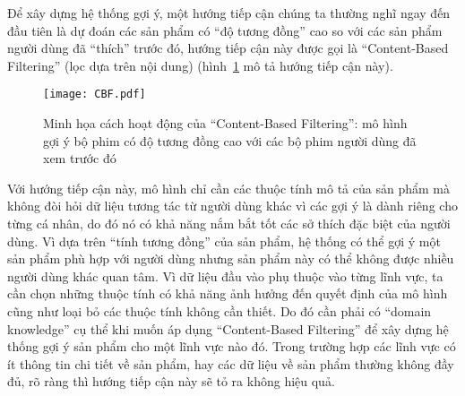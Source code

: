 Để xây dựng hệ thống gợi ý, một hướng tiếp cận chúng ta thường nghĩ ngay đến đầu tiên
là dự đoán các sản phẩm có ``độ tương đồng'' cao so với các sản phẩm người dùng đã ``thích'' trước đó,
hướng tiếp cận này được gọi là ``Content-Based Filtering'' (lọc dựa trên nội dung) (hình~\ref{fig_CBF} mô tả hướng tiếp cận này).
\begin{figure}
    \centering
	\texttt{[image: CBF.pdf]}
    \caption[Minh họa cách hoạt động của ``Content-Based Filtering'']{Minh họa cách hoạt động của ``Content-Based Filtering'':
    mô hình gợi ý bộ phim có độ tương đồng cao với các bộ phim
    người dùng đã xem trước đó}
    \label{fig_CBF}
\end{figure}
Với hướng tiếp cận này, mô hình chỉ cần các thuộc tính mô tả của sản phẩm mà 
không đòi hỏi dữ liệu tương tác từ người dùng khác
vì các gợi ý là dành riêng cho từng cá nhân, do đó nó có khả năng nắm bắt tốt các sở thích
đặc biệt của người dùng.
Vì dựa trên ``tính tương đồng'' của sản phẩm, hệ thống có thể gợi ý một sản phẩm phù hợp với người dùng nhưng sản phẩm này có thể không được nhiều người dùng khác quan tâm.
Vì dữ liệu đầu vào phụ thuộc vào từng lĩnh vực, 
ta cần chọn những thuộc tính có khả năng ảnh hưởng đến quyết định của mô hình cũng như loại bỏ các thuộc tính không cần thiết. Do đó cần phải có ``domain knowledge'' cụ thể khi muốn áp dụng ``Content-Based Filtering'' để xây dựng hệ thống gợi ý sản phẩm cho một lĩnh vực nào đó.
Trong trường hợp các lĩnh vực có ít thông tin chi tiết về sản phẩm, hay các dữ liệu về sản phẩm thường không đầy đủ, rõ ràng thì 
hướng tiếp cận này sẽ tỏ ra không hiệu quả. 

